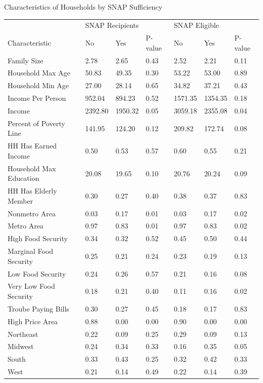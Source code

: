 \documentclass{beamer}
\begin{document}
\begin{frame}
\begin{table}{Characteristics of Households by SNAP Sufficiency}%

\begin{adjustbox}{max width=\textwidth}
  \centering
     \begin{tabular}{lllllll}
    \toprule
    & \multicolumn{3}{l}{SNAP Recipients} & \multicolumn{3}{l}{SNAP Eligible} \\

    Characteristic & No    & Yes   & P-value & No    & Yes   & P-value \\
    \midrule
    Family Size & 2.78  & 2.65  & 0.43  & 2.52  & 2.21  & 0.11 \\
    Household Max Age & 50.83 & 49.35 & 0.30  & 53.22 & 53.00 & 0.89 \\
    Household Min Age & 27.00 & 28.14 & 0.65  & 34.82 & 37.21 & 0.43 \\
    Income Per Person & 952.04 & 894.23 & 0.52  & 1571.35 & 1354.35 & 0.18 \\
    Income & 2392.80 & 1950.32 & 0.05  & 3059.18 & 2355.08 & 0.04 \\
    Percent of Poverty Line & 141.95 & 124.20 & 0.12  & 209.82 & 172.74 & 0.08 \\
    HH Has Earned Income & 0.50  & 0.53  & 0.57  & 0.60  & 0.55  & 0.21 \\
    Household Max Education & 20.08 & 19.65 & 0.10  & 20.76 & 20.24 & 0.09 \\
    HH Has Elderly Member & 0.30  & 0.27  & 0.40  & 0.38  & 0.37  & 0.83 \\
    Nonmetro Area & 0.03  & 0.17  & 0.01  & 0.03  & 0.17  & 0.02 \\
    Metro Area & 0.97  & 0.83  & 0.01  & 0.97  & 0.83  & 0.02 \\
    High Food Security & 0.34  & 0.32  & 0.52  & 0.45  & 0.50  & 0.44 \\
    Marginal Food Security & 0.25  & 0.21  & 0.24  & 0.23  & 0.19  & 0.13 \\
    Low Food Security & 0.24  & 0.26  & 0.57  & 0.21  & 0.16  & 0.08 \\
    Very Low Food Security & 0.18  & 0.21  & 0.40  & 0.11  & 0.16  & 0.02 \\
    Troube Paying Bills & 0.30  & 0.27  & 0.45  & 0.18  & 0.17  & 0.83 \\
    High Price Area & 0.88  & 0.00  & 0.00  & 0.90  & 0.00  & 0.00 \\
    Northeast & 0.22  & 0.09  & 0.25  & 0.29  & 0.09  & 0.13 \\
    Midwest & 0.24  & 0.34  & 0.33  & 0.16  & 0.35  & 0.05 \\
    South & 0.33  & 0.43  & 0.25  & 0.32  & 0.42  & 0.33 \\
    West  & 0.21  & 0.14  & 0.49  & 0.22  & 0.14  & 0.39 \\

    
    \bottomrule
\end{tabular}
\end{adjustbox}
\end{table}
\end{frame}
\end{document}
